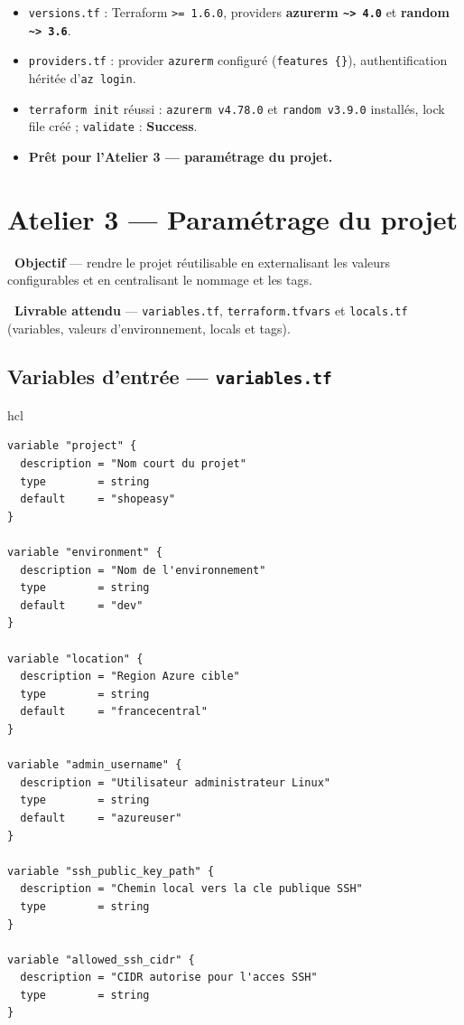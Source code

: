 \documentclass[11pt,a4paper]{article}
\newcommand{\emo}[1]{\raisebox{-0.14em}{\twemoji{#1}}}
\newcommand{\eTarget}{\emo{1f3af}}
\newcommand{\ePackage}{\emo{1f4e6}}
\newcommand{\code}[1]{\texttt{#1}}
\begin{document}
\begin{etatbox}
\begin{itemize}
  \item \code{versions.tf} : Terraform \code{>= 1.6.0}, providers \textbf{azurerm \code{\textasciitilde> 4.0}} et \textbf{random \code{\textasciitilde> 3.6}}.
  \item \code{providers.tf} : provider \code{azurerm} configuré (\code{features \{\}}), authentification héritée d'\code{az login}.
  \item \code{terraform init} réussi : \code{azurerm v4.78.0} et \code{random v3.9.0} installés, lock file créé ; \code{validate} : \textbf{Success}.
  \item \textbf{Prêt pour l'Atelier 3 — paramétrage du projet.}
\end{itemize}
\end{etatbox}

\section{Atelier 3 — Paramétrage du projet}

\begin{fiche}
\textbf{\eTarget~Objectif} — rendre le projet réutilisable en externalisant les valeurs configurables et en centralisant le nommage et les tags.

\textbf{\ePackage~Livrable attendu} — \code{variables.tf}, \code{terraform.tfvars} et \code{locals.tf} (variables, valeurs d'environnement, locals et tags).
\end{fiche}

\subsection{Variables d'entrée — \code{variables.tf}}
\begin{codebox}{hcl}
\begin{Verbatim}
variable "project" {
  description = "Nom court du projet"
  type        = string
  default     = "shopeasy"
}

variable "environment" {
  description = "Nom de l'environnement"
  type        = string
  default     = "dev"
}

variable "location" {
  description = "Region Azure cible"
  type        = string
  default     = "francecentral"
}

variable "admin_username" {
  description = "Utilisateur administrateur Linux"
  type        = string
  default     = "azureuser"
}

variable "ssh_public_key_path" {
  description = "Chemin local vers la cle publique SSH"
  type        = string
}

variable "allowed_ssh_cidr" {
  description = "CIDR autorise pour l'acces SSH"
  type        = string
}
\end{Verbatim}
\end{codebox}
\end{document}
